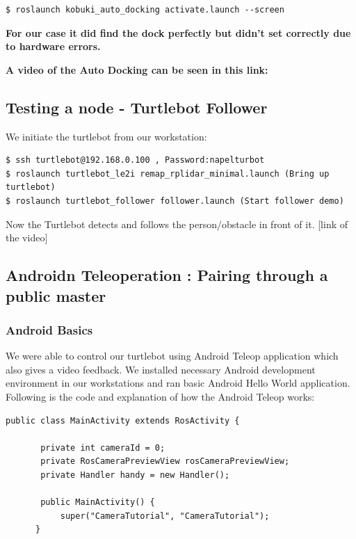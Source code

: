 \documentclass[10pt,a4paper]{article}
\begin{document}
\begin{lstlisting}[frame=single] 
$ roslaunch kobuki_auto_docking activate.launch --screen
\end{lstlisting}

\textbf{For our case it did find the dock perfectly but didn't set correctly due to hardware errors.}

\textbf{A video of the Auto Docking can be seen in this link:}\\

\subsection{Testing a node - Turtlebot Follower}
We initiate the turtlebot from our workstation:
\begin{lstlisting}[frame=single]
$ ssh turtlebot@192.168.0.100 , Password:napelturbot
$ roslaunch turtlebot_le2i remap_rplidar_minimal.launch (Bring up turtlebot)
$ roslaunch turtlebot_follower follower.launch (Start follower demo)
\end{lstlisting}
Now the Turtlebot detects and follows the person/obstacle in front of it.
[link of the video]

\subsection{Androidn Teleoperation : Pairing through a public master}

\subsubsection{Android Basics}
We were able to control our turtlebot using Android Teleop application which also gives a video feedback.
We installed necessary Android development environment in our workstations and ran basic Android Hello World application. 
Following is the code and explanation of how the Android Teleop works:

\begin{lstlisting}[frame=single] 
public class MainActivity extends RosActivity {
    
       private int cameraId = 0;
       private RosCameraPreviewView rosCameraPreviewView;
       private Handler handy = new Handler();
    
       public MainActivity() {
           super("CameraTutorial", "CameraTutorial");
      }
   
\end{lstlisting}
   
\end{document}

